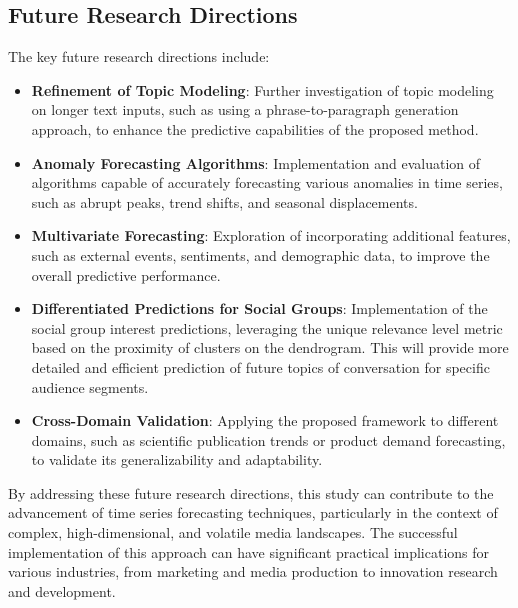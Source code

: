 \subsection{Future Research Directions}
The key future research directions include:

\begin{itemize}
\item \textbf{Refinement of Topic Modeling}: Further investigation of topic modeling on longer text inputs, such as using a phrase-to-paragraph generation approach, to enhance the predictive capabilities of the proposed method.
\item \textbf{Anomaly Forecasting Algorithms}: Implementation and evaluation of algorithms capable of accurately forecasting various anomalies in time series, such as abrupt peaks, trend shifts, and seasonal displacements.
\item \textbf{Multivariate Forecasting}: Exploration of incorporating additional features, such as external events, sentiments, and demographic data, to improve the overall predictive performance.
\item \textbf{Differentiated Predictions for Social Groups}: Implementation of the social group interest predictions, leveraging the unique relevance level metric based on the proximity of clusters on the dendrogram. This will provide more detailed and efficient prediction of future topics of conversation for specific audience segments.
\item \textbf{Cross-Domain Validation}: Applying the proposed framework to different domains, such as scientific publication trends or product demand forecasting, to validate its generalizability and adaptability.
\end{itemize}

By addressing these future research directions, this study can contribute to the advancement of time series forecasting techniques, particularly in the context of complex, high-dimensional, and volatile media landscapes. The successful implementation of this approach can have significant practical implications for various industries, from marketing and media production to innovation research and development.






  
 






